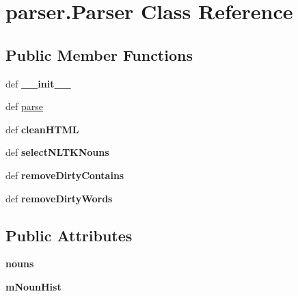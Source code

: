 \hypertarget{classparser_1_1Parser}{\section{parser.\-Parser Class Reference}
\label{classparser_1_1Parser}
}
\subsection*{Public Member Functions}
\begin{DoxyCompactItemize}
\item 
\hypertarget{classparser_1_1Parser_a970813fabceef8e022be33279f564ce8}{def {\bfseries \-\_\-\-\_\-init\-\_\-\-\_\-}}\label{classparser_1_1Parser_a970813fabceef8e022be33279f564ce8}

\item 
def \hyperlink{classparser_1_1Parser_a56a4ab5316fea1a523fbd9378f517650}{parse}
\item 
\hypertarget{classparser_1_1Parser_a0295c9dfc60bc342b26afb05f095ea96}{def {\bfseries clean\-H\-T\-M\-L}}\label{classparser_1_1Parser_a0295c9dfc60bc342b26afb05f095ea96}

\item 
\hypertarget{classparser_1_1Parser_a598633d4b01ba904f0154fa19826c384}{def {\bfseries select\-N\-L\-T\-K\-Nouns}}\label{classparser_1_1Parser_a598633d4b01ba904f0154fa19826c384}

\item 
\hypertarget{classparser_1_1Parser_aeb28313317dd1ed5af1631813641d170}{def {\bfseries remove\-Dirty\-Contains}}\label{classparser_1_1Parser_aeb28313317dd1ed5af1631813641d170}

\item 
\hypertarget{classparser_1_1Parser_ac7a3790160a8f661c6c08123a0aa1718}{def {\bfseries remove\-Dirty\-Words}}\label{classparser_1_1Parser_ac7a3790160a8f661c6c08123a0aa1718}

\end{DoxyCompactItemize}
\subsection*{Public Attributes}
\begin{DoxyCompactItemize}
\item 
\hypertarget{classparser_1_1Parser_a4037b5d92197b949f9728de47a754b16}{{\bfseries nouns}}\label{classparser_1_1Parser_a4037b5d92197b949f9728de47a754b16}

\item 
\hypertarget{classparser_1_1Parser_ac3cc5b6a9f0e1e383b8ba8eba92a9d56}{{\bfseries m\-Noun\-Hist}}\label{classparser_1_1Parser_ac3cc5b6a9f0e1e383b8ba8eba92a9d56}

\end{DoxyCompactItemize}


